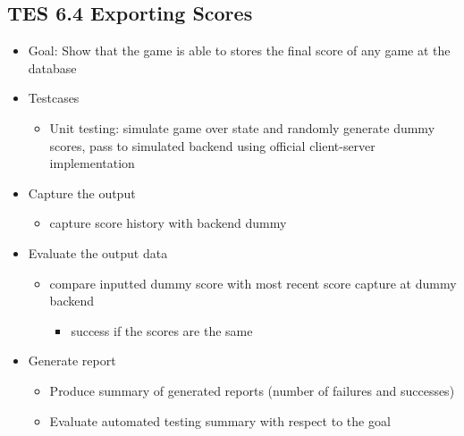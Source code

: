 \subsection{TES 6.4 Exporting Scores}
\begin{itemize}
\item Goal: Show that the game is able to stores the final score of any game at the database 

\item Testcases
\begin{itemize}
\item Unit testing: simulate game over state and randomly generate dummy scores, pass to simulated backend using official client-server implementation
\end{itemize}

\item Capture the output
\begin{itemize}
\item capture score history with backend dummy
\end{itemize}

\item Evaluate the output data
\begin{itemize}
\item compare inputted dummy score with most recent score capture at dummy backend
\begin{itemize}
\item success if the scores are the same
\end{itemize}
\end{itemize}

\item Generate report
\begin{itemize}
\item Produce summary of generated reports (number of failures and successes)
\item Evaluate automated testing summary with respect to the goal
\end{itemize}
\end{itemize}



